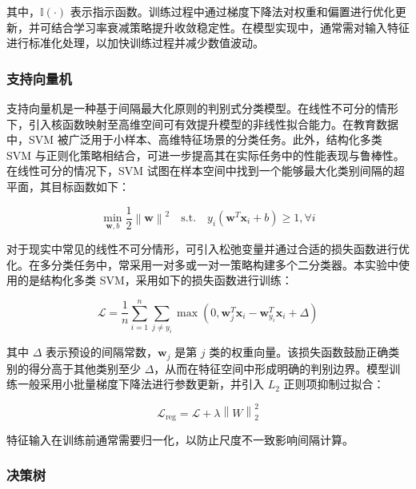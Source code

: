 \documentclass[a4paper, utf8]{ctexart}
\begin{document}
	其中，$\mathbb{I}(\cdot)$ 表示指示函数。训练过程中通过梯度下降法对权重和偏置进行优化更新，并可结合学习率衰减策略提升收敛稳定性。在模型实现中，通常需对输入特征进行标准化处理，以加快训练过程并减少数值波动。
	
	\subsubsection{支持向量机}
	
	支持向量机是一种基于间隔最大化原则的判别式分类模型。在线性不可分的情形下，引入核函数映射至高维空间可有效提升模型的非线性拟合能力。在教育数据中，SVM 被广泛用于小样本、高维特征场景的分类任务\cite{ref7,ref19}。此外，结构化多类 SVM 与正则化策略相结合，可进一步提高其在实际任务中的性能表现与鲁棒性。在线性可分的情况下，SVM 试图在样本空间中找到一个能够最大化类别间隔的超平面，其目标函数如下：
	
	\vspace{-.5em}
	\begin{equation}
		\min_{\mathbf{w},b}\frac{1}{2}\left\| \mathbf{w} \right\|^2 \quad \text{s.t.} \quad y_i(\mathbf{w}^T\mathbf{x}_i+b)\geq1,\forall i
	\end{equation}
	
	对于现实中常见的线性不可分情形，可引入松弛变量并通过合适的损失函数进行优化。在多分类任务中，常采用一对多或一对一策略构建多个二分类器。本实验中使用的是结构化多类 SVM，采用如下的损失函数进行训练：
	
	\vspace{-.5em}
	\begin{equation}
		\mathcal{L}=\frac{1}{n}\sum^n_{i=1}\sum_{j\neq y_i}\max(0, \mathbf{w}^T_j\mathbf{x}_i-\mathbf{w}^T_{y_i}\mathbf{x}_i+\Delta)
	\end{equation}
	
	其中 $\Delta$ 表示预设的间隔常数，$\mathbf{w}_j$ 是第 $j$ 类的权重向量。该损失函数鼓励正确类别的得分高于其他类别至少 $\Delta$，从而在特征空间中形成明确的判别边界。模型训练一般采用小批量梯度下降法进行参数更新，并引入 $L_2$ 正则项抑制过拟合：
	
	\vspace{-.5em}
	\begin{equation}
		\mathcal{L}_{\text{reg}}=\mathcal{L}+\lambda \left\|W\right\|^2_2
	\end{equation}
	
	特征输入在训练前通常需要归一化，以防止尺度不一致影响间隔计算。
	
	\subsubsection{决策树}
	
\end{document}
